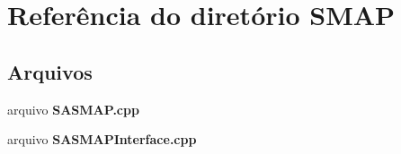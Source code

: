 \section{Referência do diretório S\+M\+AP}
\label{dir_20f07fe57e57507deab3c7a61030da9d}
\subsection*{Arquivos}
\begin{DoxyCompactItemize}
\item 
arquivo {\bf S\+A\+S\+M\+A\+P.\+cpp}
\item 
arquivo {\bf S\+A\+S\+M\+A\+P\+Interface.\+cpp}
\end{DoxyCompactItemize}
